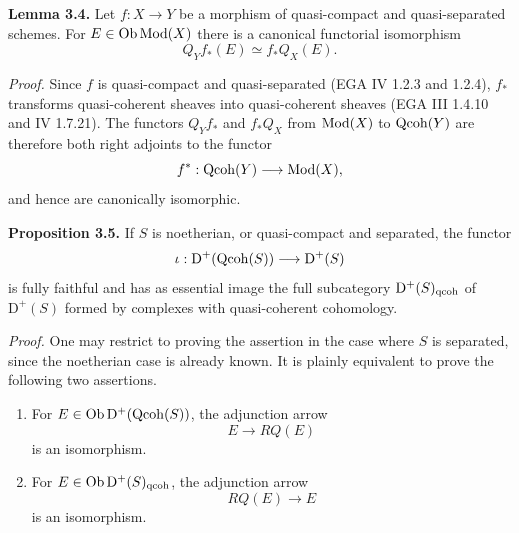 \documentclass[11pt]{article}
\begin{document}
\textbf{Lemma 3.4.} Let $f:X\to Y$ be a morphism of quasi-compact and quasi-separated schemes. For $E\in\operatorname{Ob}\operatorname{Mod}(X)$ there is a canonical functorial isomorphism
\[
 Q_Y f_*(E)\simeq f_*Q_X(E).
\]

\emph{Proof.} Since $f$ is quasi-compact and quasi-separated (EGA IV 1.2.3 and 1.2.4), $f_*$ transforms quasi-coherent sheaves into quasi-coherent sheaves (EGA III 1.4.10 and IV 1.7.21). The functors $Q_Yf_*$ and $f_*Q_X$ from $\operatorname{Mod}(X)$ to $\operatorname{Qcoh}(Y)$ are therefore both right adjoints to the functor
\[
 f^*: \operatorname{Qcoh}(Y)\longrightarrow \operatorname{Mod}(X),
\]
and hence are canonically isomorphic.

\textbf{Proposition 3.5.} If $S$ is noetherian, or quasi-compact and separated, the functor
\[
 \iota:\mathrm D^+(\operatorname{Qcoh}(S))\longrightarrow \mathrm D^+(S)
\]
is fully faithful and has as essential image the full subcategory $\mathrm D^+(S)_{\mathrm{qcoh}}$ of $\mathrm D^+(S)$ formed by complexes with quasi-coherent cohomology.

\emph{Proof.} One may restrict to proving the assertion in the case where $S$ is separated, since the noetherian case is already known. It is plainly equivalent to prove the following two assertions.

\begin{enumerate}[label=(3.5.\arabic*)]
\item For $E\in\operatorname{Ob}\mathrm D^+(\operatorname{Qcoh}(S))$, the adjunction arrow
\[
 E\longrightarrow RQ(E)
\]
is an isomorphism.
\item For $E\in\operatorname{Ob}\mathrm D^+(S)_{\mathrm{qcoh}}$, the adjunction arrow
\[
 RQ(E)\longrightarrow E
\]
is an isomorphism.
\end{enumerate}
\end{document}
